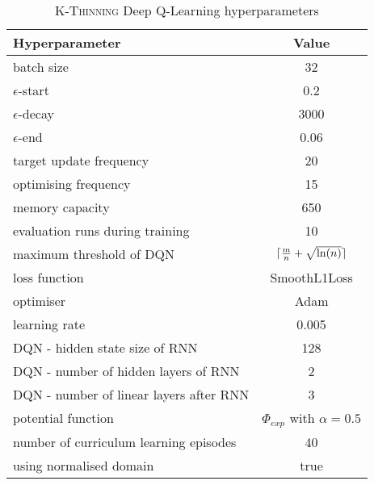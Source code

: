 \begin{table}[ht]
\centering
\begin{threeparttable}
\centering
\begin{tabular}{l|c}
\toprule
Hyperparameter             &     Value \\
\midrule
batch size               &     32 \\ 
$\epsilon$-start               &    0.2 \\ 
$\epsilon$-decay         &     3000\\
$\epsilon$-end              &     0.06 \\
target update frequency               &     20 \\ 
optimising frequency          &     15 \\ 
memory capacity     &     650 \\
evaluation runs during training             &     10 \\
maximum threshold of DQN             &     $\lceil\frac{m}{n}+\sqrt{\ln(n)}\rceil$ \\ 
loss function               &     SmoothL1Loss \\ 
optimiser        &     Adam \\
learning rate             &     0.005 \\
DQN - hidden state size of RNN               &     128 \\ 
DQN - number of hidden layers of RNN         &     2 \\ 
DQN - number of linear layers after RNN     &     3 \\
potential function            &    $\Phi_{exp}$ with $\alpha=0.5$ \\
number of curriculum learning episodes            & 40 \\ 
using normalised domain               &     true \\ 
\bottomrule
\end{tabular}
\end{threeparttable}
\caption{\textsc{K-Thinning} Deep Q-Learning hyperparameters}
\label{tab:k-thinning-hyperparameters}
\end{table}



